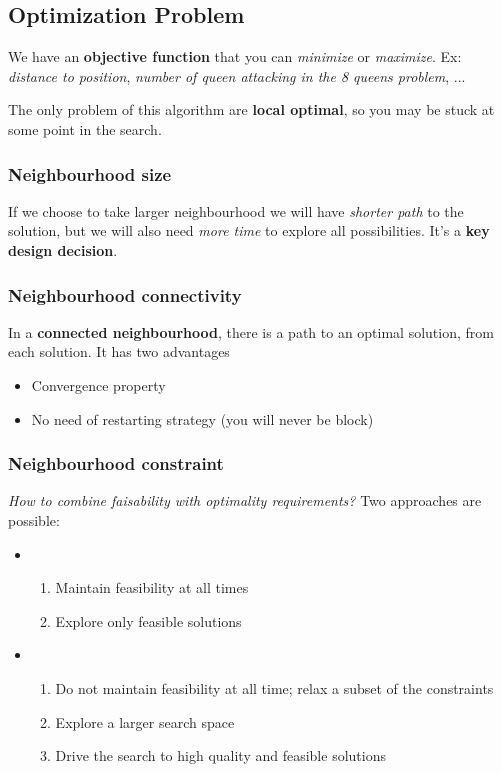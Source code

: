 \subsection{Optimization Problem}

We have an \textbf{objective function} that you can \textit{minimize} or \textit{maximize}. Ex: \textit{distance to position}, \textit{number of queen attacking in the 8 queens problem}, ...

The only problem of this algorithm are \textbf{local optimal}, so you may be stuck at some point in the search. 

\subsubsection{Neighbourhood size}

If we choose to take larger neighbourhood we will have \textit{shorter path} to the solution, but we will also need \textit{more time} to explore all possibilities. It's a \textbf{key design decision}.

\subsubsection{Neighbourhood connectivity}

In a \textbf{connected neighbourhood}, there is a path to an optimal solution, from each solution. It has two advantages
\begin{itemize}
\item Convergence property
\item No need of restarting strategy (you will never be block)
\end{itemize}

\subsubsection{Neighbourhood constraint}

\textit{How to combine faisability with optimality requirements?} Two approaches are possible:
\begin{itemize}
\item
	\begin{enumerate}
	\item Maintain feasibility at all times
	\item Explore only feasible solutions
	\end{enumerate}
\item 
	\begin{enumerate}
	\item Do not maintain feasibility at all time; relax a subset of the constraints
	\item Explore a larger search space
	\item Drive the search to high quality and feasible solutions
	\end{enumerate}
\end{itemize}

